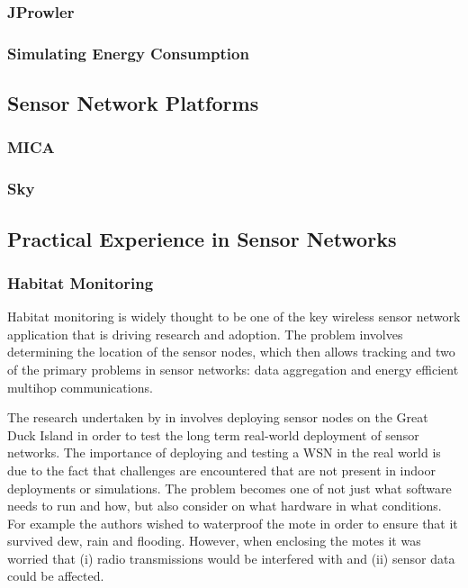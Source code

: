 \subsubsection*{JProwler}

\subsubsection*{Simulating Energy Consumption}
\cite{Shnayder04}


\subsection{Sensor Network Platforms}

\subsubsection*{MICA}
\cite{Mica2002}

\subsubsection*{Sky}


\subsection{Practical Experience in Sensor Networks}
\label{sec:lit-review-practical-experience}

\subsubsection*{Habitat Monitoring}

Habitat monitoring is widely thought to be one of the key wireless sensor network application that is driving research and adoption. The problem involves determining the location of the sensor nodes, which then allows tracking \cite{Cerpa:2001:HMA:844193.844196} and two of the primary problems in sensor networks: data aggregation and energy efficient multihop communications.

The research undertaken by \citeauthor{SzewczykPMC04} in \cite{SzewczykPMC04} involves deploying sensor nodes on the Great Duck Island in order to test the long term real-world deployment of sensor networks. The importance of deploying and testing a WSN in the real world is due to the fact that challenges are encountered that are not present in indoor deployments or simulations. The problem becomes one of not just what software needs to run and how, but also consider on what hardware in what conditions. For example the authors wished to waterproof the mote in order to ensure that it survived dew, rain and flooding. However, when enclosing the motes it was worried that (i) radio transmissions would be interfered with and (ii) sensor data could be affected.

